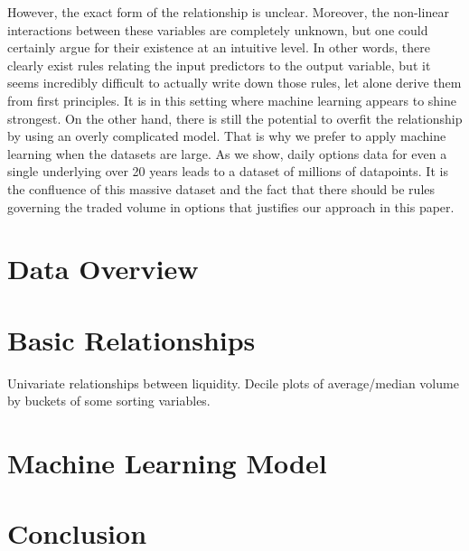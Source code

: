 \documentclass[12pt]{article}
\numberwithin{theorem}{section}
\numberwithin{equation}{section}
\numberwithin{remark}{section}
\numberwithin{definition}{section}
\numberwithin{theorem}{section}
\numberwithin{lemma}{section}
\numberwithin{example}{section}
\begin{document}
However, the exact form of the relationship is unclear. Moreover, the non-linear interactions between these variables are completely unknown, but one could certainly argue for their existence at an intuitive level. In other words, there clearly exist rules relating the input predictors to the output variable, but it seems incredibly difficult to actually write down those rules, let alone derive them from first principles. It is in this setting where machine learning appears to shine strongest. On the other hand, there is still the potential to overfit the relationship by using an overly complicated model. That is why we prefer to apply machine learning when the datasets are large. As we show, daily options data for even a single underlying over 20 years leads to a dataset of millions of datapoints. It is the confluence of this massive dataset and the fact that there should be rules governing the traded volume in options that justifies our approach in this paper. 

\section{Data Overview}


\section{Basic Relationships}
Univariate relationships between liquidity. Decile plots of average/median volume by buckets of some sorting variables. 

\section{Machine Learning Model}


\section{Conclusion}
\end{document}
